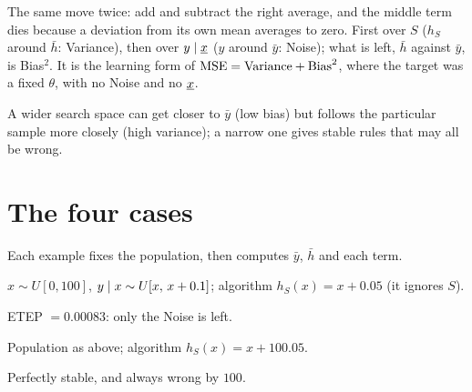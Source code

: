 The same move twice: add and subtract the right average, and the middle term dies because a deviation from its own mean averages to zero. First over $S$ ($h_S$ around $\bar h$: Variance), then over $y\mid\underline{x}$ ($y$ around $\bar y$: Noise); what is left, $\bar h$ against $\bar y$, is Bias$^2$. It is the learning form of $\operatorname{MSE}=\text{Variance}+\text{Bias}^2$, where the target was a fixed $\theta$, with no Noise and no $\underline{x}$.

A wider search space can get closer to $\bar y$ (low bias) but follows the particular sample more closely (high variance); a narrow one gives stable rules that may all be wrong.

\section{The four cases}

Each example fixes the population, then computes $\bar y$, $\bar h$ and each term.

\begin{example}
$x\sim U[0,100]$, $y\mid x\sim U[x,\,x+0.1]$; algorithm $h_S(x)=x+0.05$ (it ignores $S$).
\begin{deriv}
\end{deriv}
ETEP $=0.00083$: only the Noise is left.
\end{example}

\begin{example}
Population as above; algorithm $h_S(x)=x+100.05$.
\begin{deriv}
\end{deriv}
Perfectly stable, and always wrong by $100$.
\end{example}

